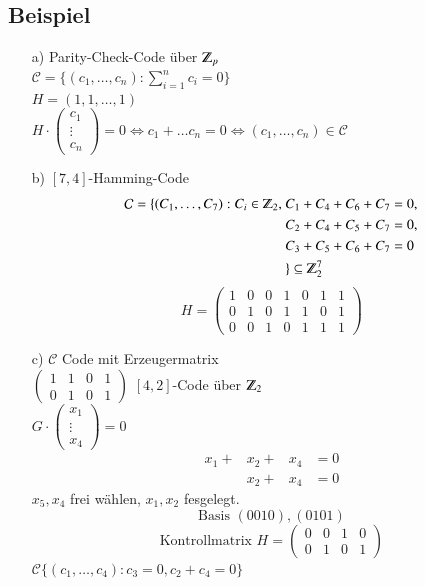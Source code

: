 \subsection{Beispiel}
\begin{itemize}
	\item [a)] Parity-Check-Code \"uber $\Z_p$ \\
	$\mathcal{C} = \lbrace (c_1,\ldots,c_n): \sum^n_{i=1}{c_i}=0 \rbrace$\\ %
	$H=(1,1,\ldots,1)$\\
	$H \cdot
	\begin{pmatrix}
	c_1 \\
	\vdots \\
	c_n
	\end{pmatrix}
	= 0 \Leftrightarrow c_1 + \ldots c_n = 0 \Leftrightarrow (c_1,\ldots,c_n) \in \mathcal{C}$
	\item [b)] $[7,4]$-Hamming-Code
	\begin{align*}
	\mathcal{C} = \lbrace (C_1,\ldots,C_7) : C_i \in \Z_2,\ &C_1 + C_4 + C_6 + C_7 = 0,\\
										&C_2 + C_4 + C_5 + C_7 = 0,\\
										&C_3 + C_5 + C_6 + C_7 = 0\\
										 &\rbrace \subseteq \Z_2^7
	\end{align*}
	\[	H=
		\begin{pmatrix}
			1 & 0 & 0 & 1 & 0 & 1 & 1\\
			0 & 1 & 0 & 1 & 1 & 0 & 1\\
			0 & 0 & 1 & 0 & 1 & 1 & 1
		\end{pmatrix}
	\]
	\item [c)] $\mathcal{C}$ Code mit Erzeugermatrix\\
	$
	\begin{pmatrix}
		1 & 1 & 0 & 1\\
		0 & 1 & 0 & 1
	\end{pmatrix}$
	 $[4,2]$-Code \"uber $\Z_2$\\
	 $G \cdot
	 \begin{pmatrix}
	 x_1 \\
	 \vdots \\
	 x_4
	 \end{pmatrix}
	 =0$
	 \begin{align*}
	 	x_1+&x_2 + &x_4&=0\\
	 	&x_2 + &x_4 &=0
	\end{align*}
	$x_5,x_4$ frei w\"ahlen, $x_1,x_2$ fesgelegt.\\
	\[
		\text{Basis }
		(0 0 1 0), (0 1 0 1)
	\]	
	\[
		\text{Kontrollmatrix }
		H=
		\begin{pmatrix}
			0 & 0 & 1 & 0 \\
			0 & 1 & 0 & 1
		\end{pmatrix}
	\]
	$\mathcal{C} \lbrace (c_1,\ldots,c_4) : c_3=0,c_2+c_4=0\rbrace$	
\end{itemize}
